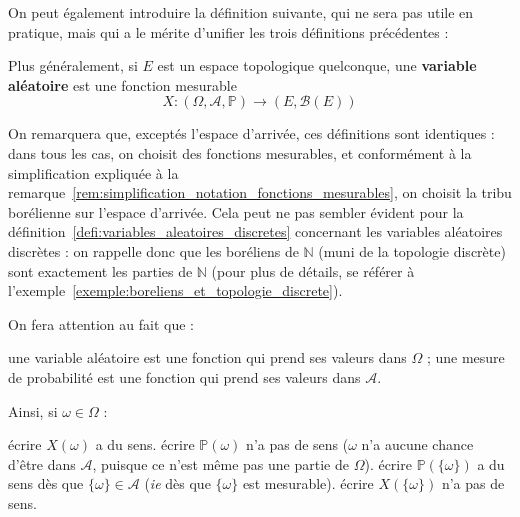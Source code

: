 \documentclass[../integ-proba.tex]{subfiles}
\begin{document}
    On peut également introduire la définition suivante, qui ne sera pas utile en pratique, mais qui a le mérite d'unifier les trois définitions précédentes :

    \begin{defi}
        Plus généralement, si $E$ est un espace topologique quelconque, une \textbf{variable aléatoire} est une fonction mesurable
        \begin{displaymath}
          X:\left(\Omega, \mathcal{A}, \mathbb{P}\right) \longrightarrow \left(E, \mathcal{B}(E)\right)
        \end{displaymath}
    \end{defi}

    \begin{rem}
        On remarquera que, exceptés l'espace d'arrivée, ces définitions sont identiques : dans tous les cas, on choisit des fonctions mesurables, et conformément à la simplification expliquée à la remarque~\ref{rem:simplification_notation_fonctions_mesurables}, on choisit la tribu borélienne sur l'espace d'arrivée.
        Cela peut ne pas sembler évident pour la définition~\ref{defi:variables_aleatoires_discretes} concernant les variables aléatoires discrètes : on rappelle donc que les boréliens de $\mathbb{N}$ (muni de la topologie discrète) sont exactement les parties de $\mathbb{N}$ (pour plus de détails, se référer à l'exemple~\ref{exemple:boreliens_et_topologie_discrete}).
    \end{rem}

    \begin{rem}
        On fera attention au fait que :
        \begin{itemize}
            \itemb une variable aléatoire est une fonction qui prend ses valeurs dans $\Omega$ ;
            \itemb une mesure de probabilité est une fonction qui prend ses valeurs dans $\mathcal{A}$.
        \end{itemize}
        Ainsi, si $\omega \in \Omega$ :
        \begin{itemize}
            \itemb écrire $X(\omega)$ a du sens.
            \itemb écrire $\mathbb{P}(\omega)$ n'a pas de sens ($\omega$ n'a aucune chance d'être dans $\mathcal{A}$, puisque ce n'est même pas une partie de $\Omega$).
            \itemb écrire $\mathbb{P}(\{\omega\})$ a du sens dès que $\{\omega\}\in \mathcal{A}$ (\textit{ie} dès que $\{\omega\}$ est mesurable).
            \itemb écrire $X(\{\omega\})$ n'a pas de sens.
        \end{itemize}
    \end{rem}
\end{document}
